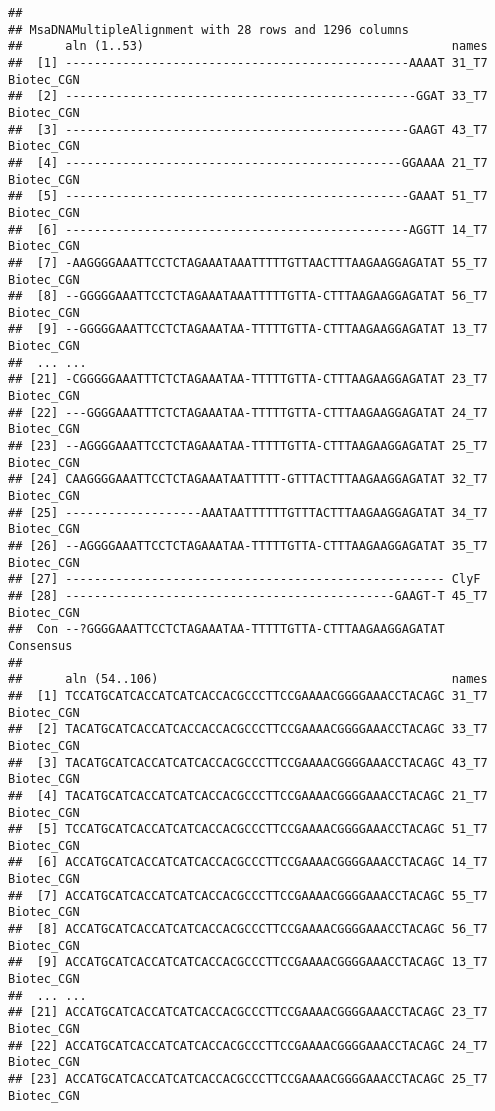 \documentclass[
]{article}
\begin{document}
\begin{verbatim}
## 
## MsaDNAMultipleAlignment with 28 rows and 1296 columns
##      aln (1..53)                                           names
##  [1] ------------------------------------------------AAAAT 31_T7 Biotec_CGN
##  [2] -------------------------------------------------GGAT 33_T7 Biotec_CGN
##  [3] ------------------------------------------------GAAGT 43_T7 Biotec_CGN
##  [4] -----------------------------------------------GGAAAA 21_T7 Biotec_CGN
##  [5] ------------------------------------------------GAAAT 51_T7 Biotec_CGN
##  [6] ------------------------------------------------AGGTT 14_T7 Biotec_CGN
##  [7] -AAGGGGAAATTCCTCTAGAAATAAATTTTTGTTAACTTTAAGAAGGAGATAT 55_T7 Biotec_CGN
##  [8] --GGGGGAAATTCCTCTAGAAATAAATTTTTGTTA-CTTTAAGAAGGAGATAT 56_T7 Biotec_CGN
##  [9] --GGGGGAAATTCCTCTAGAAATAA-TTTTTGTTA-CTTTAAGAAGGAGATAT 13_T7 Biotec_CGN 
##  ... ...
## [21] -CGGGGGAAATTTCTCTAGAAATAA-TTTTTGTTA-CTTTAAGAAGGAGATAT 23_T7 Biotec_CGN
## [22] ---GGGGAAATTTCTCTAGAAATAA-TTTTTGTTA-CTTTAAGAAGGAGATAT 24_T7 Biotec_CGN
## [23] --AGGGGAAATTCCTCTAGAAATAA-TTTTTGTTA-CTTTAAGAAGGAGATAT 25_T7 Biotec_CGN
## [24] CAAGGGGAAATTCCTCTAGAAATAATTTTT-GTTTACTTTAAGAAGGAGATAT 32_T7 Biotec_CGN
## [25] -------------------AAATAATTTTTTGTTTACTTTAAGAAGGAGATAT 34_T7 Biotec_CGN
## [26] --AGGGGAAATTCCTCTAGAAATAA-TTTTTGTTA-CTTTAAGAAGGAGATAT 35_T7 Biotec_CGN
## [27] ----------------------------------------------------- ClyF
## [28] ----------------------------------------------GAAGT-T 45_T7 Biotec_CGN
##  Con --?GGGGAAATTCCTCTAGAAATAA-TTTTTGTTA-CTTTAAGAAGGAGATAT Consensus 
## 
##      aln (54..106)                                         names
##  [1] TCCATGCATCACCATCATCACCACGCCCTTCCGAAAACGGGGAAACCTACAGC 31_T7 Biotec_CGN
##  [2] TACATGCATCACCATCACCACCACGCCCTTCCGAAAACGGGGAAACCTACAGC 33_T7 Biotec_CGN
##  [3] TACATGCATCACCATCATCACCACGCCCTTCCGAAAACGGGGAAACCTACAGC 43_T7 Biotec_CGN
##  [4] TACATGCATCACCATCATCACCACGCCCTTCCGAAAACGGGGAAACCTACAGC 21_T7 Biotec_CGN
##  [5] TCCATGCATCACCATCATCACCACGCCCTTCCGAAAACGGGGAAACCTACAGC 51_T7 Biotec_CGN
##  [6] ACCATGCATCACCATCATCACCACGCCCTTCCGAAAACGGGGAAACCTACAGC 14_T7 Biotec_CGN
##  [7] ACCATGCATCACCATCATCACCACGCCCTTCCGAAAACGGGGAAACCTACAGC 55_T7 Biotec_CGN
##  [8] ACCATGCATCACCATCATCACCACGCCCTTCCGAAAACGGGGAAACCTACAGC 56_T7 Biotec_CGN
##  [9] ACCATGCATCACCATCATCACCACGCCCTTCCGAAAACGGGGAAACCTACAGC 13_T7 Biotec_CGN 
##  ... ...
## [21] ACCATGCATCACCATCATCACCACGCCCTTCCGAAAACGGGGAAACCTACAGC 23_T7 Biotec_CGN
## [22] ACCATGCATCACCATCATCACCACGCCCTTCCGAAAACGGGGAAACCTACAGC 24_T7 Biotec_CGN
## [23] ACCATGCATCACCATCATCACCACGCCCTTCCGAAAACGGGGAAACCTACAGC 25_T7 Biotec_CGN

\end{verbatim}
\end{document}
